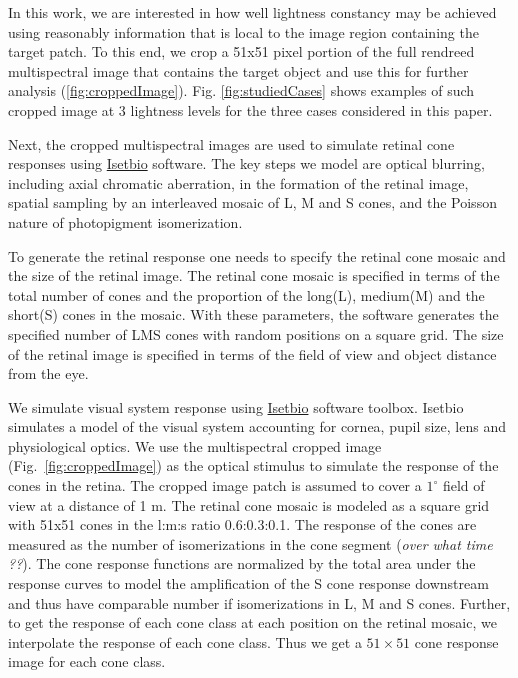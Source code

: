 \documentclass{jov}
\begin{document}
In this work, we are interested in how well lightness constancy may be achieved using reasonably information that is local to the image region containing the target patch.
To this end, we crop a 51x51 pixel portion of the full rendreed multispectral image that contains the target object and use this for further analysis (\ref{fig:croppedImage}).
Fig. \ref{fig:studiedCases} shows examples of such cropped image at 3 lightness levels for the three cases considered in this paper.

Next, the cropped multispectral images are used to simulate retinal cone responses using \href{https://github.com/isetbio}{Isetbio} software. The key steps we model are optical blurring, including axial chromatic aberration, in the formation of the retinal image, spatial sampling by an interleaved mosaic of L, M and S cones, and the Poisson nature of photopigment isomerization.  

To generate the retinal response one needs to specify the retinal cone mosaic and the size of the retinal image. The retinal cone mosaic is specified in terms of the total number of cones and the proportion of the long(L), medium(M) and the short(S) cones in the mosaic. With these parameters, the software generates the specified number of LMS cones with random positions on a square grid. The size of the retinal image is specified in terms of the field of view and object distance from the eye. 


We simulate visual system response using \href{http://isetbio.org}{Isetbio} software toolbox. Isetbio simulates a model of the visual system accounting for cornea, pupil size, lens and physiological optics. We use the multispectral cropped image (Fig.~\ref{fig:croppedImage}) as the optical stimulus to simulate the response of the cones in the retina. The cropped image patch is assumed to cover a $1^{\circ}$ field of view at a distance of 1 m. The retinal cone mosaic is modeled as a square grid with 51x51 cones in the l:m:s ratio 0.6:0.3:0.1. The response of the cones are measured as the number of isomerizations in the cone segment ({\it over what time ??}). The cone response functions are normalized by the total area under the response curves to model the amplification of the S cone response downstream and thus have comparable number if isomerizations in L, M and S cones. Further, to get the response of each cone class at each position on the retinal mosaic, we interpolate the response of each cone class. Thus we get a $51 \times 51$ cone response image for each cone class.
\end{document}
